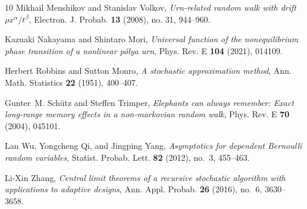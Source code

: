 \documentclass[12pt]{amsart}
\theoremstyle{plain}
\theoremstyle{remark}
\numberwithin{equation}{section}
\begin{document}
\begin{thebibliography}{10}
Mikhail Menshikov and Stanislav Volkov, \emph{Urn-related random walk with drift {$\rho x^\alpha/t^\beta$}}, Electron. J. Probab. \textbf{13} (2008), no. 31, 944--960. 

Kazuaki Nakayama and Shintaro Mori, \emph{Universal function of the nonequilibrium phase transition of a nonlinear p\'olya urn}, Phys. Rev. E \textbf{104} (2021), 014109.

Herbert Robbins and Sutton Monro, \emph{A stochastic approximation method}, Ann. Math. Statistics \textbf{22} (1951), 400--407. 

Gunter~M. Sch\"utz and Steffen Trimper, \emph{Elephants can always remember: Exact long-range memory effects in a non-markovian random walk}, Phys. Rev. E \textbf{70} (2004), 045101.

Lan Wu, Yongcheng Qi, and Jingping Yang, \emph{Asymptotics for dependent {B}ernoulli random variables}, Statist. Probab. Lett. \textbf{82} (2012), no.~3, 455--463. 

Li-Xin Zhang, \emph{Central limit theorems of a recursive stochastic algorithm with applications to adaptive designs}, Ann. Appl. Probab. \textbf{26} (2016), no.~6, 3630--3658. 

\end{thebibliography}
\end{document}
